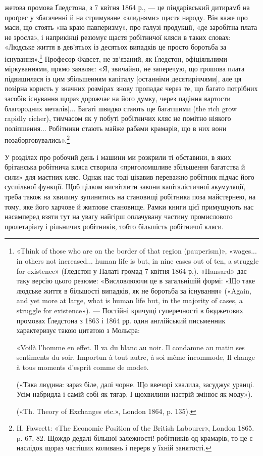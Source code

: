 жетова промова Ґледстона, з 7 квітня 1864 р., — це піндарівський
дитирамб на проґрес у збагаченні й на стримуване «злиднями»
щастя народу. Він каже про маси, що стоять «на краю
павперизму», про галузі продукції, «де заробітна плата не
зросла», і наприкінці резюмує щастя робітничої кляси в таких
словах: «Людське життя в дев’ятьох із десятьох випадків це
просто боротьба за існування».\footnote{
«Think of those who are on the border of that region (pauperism)»,
«wages... in others not increased... human life is but, in nine cases out of ten,
a struggle for existence» (Ґледстон у Палаті громад 7 квітня 1864 р.).
«Hansard» дає таку версію цього резюме: «Висловлюючи це в загальнішій
формі: «Що таке людське життя в більшості випадків, як не боротьба
за існування» («Again, and yet more at large, what is human life but,
in the majority of cases, a struggle for existence»). — Постійні кричущі суперечності
в бюджетових промовах Ґледстона з 1863 і 1864 рр. один англійський
письменник характеризує такою цитатою з Мольєра:

«Voilà l’homme en effet. Il va du blanc au noir.
Il condamne au matin ses sentiments du soir.
Importun à tout autre, à soi même incommode,
Il change à tous moments d’esprit comme de mode».

(«Така людина: зараз біле, далі чорне.
Що ввечорі хвалила, засуджує уранці.
Усім набридла і самій собі як тягар,
І щохвилини настрій змінює як моду»).

(«Th. Theory of Exchanges etc.»,
London 1864, p. 135).
} Професор Фавсет, не зв’язаний,
як Ґледстон, офіціяльними міркуваннями, прямо заявляє:
«Я, звичайно, не заперечую, що грошова плата підвищилася із
цим збільшенням капіталу [останніми десятиріччями], але ця
позірна користь у значних розмірах знову пропадає через те,
що багато потрібних засобів існування щораз дорожчає на його
думку, через падіння вартости благородних металів]... Багаті
швидко стають ще багатшими (the rich grow rapidly richer),
тимчасом як у побуті робітничих кляс не помітно ніякого поліпшення...
Робітники стають майже рабами крамарів, що в них
вони позаборговувались».\footnote{
H. Fawcett: «The Economie Position of the British Labourer»,
London 1865. p. 67, 82. Щождо дедалі більшої залежності! робітників од
крамарів, то це є наслідок щораз частіших коливань і перерв у їхній
занятості.
}

У розділах про робочий день і машини ми розкрили ті обставини,
в яких брітанська робітнича кляса створила «приголомшливе
збільшення багатства й сили» для маєтних кляс. Однак
нас тоді цікавив переважно робітник підчас його суспільної
функції. Щоб цілком висвітлити закони капіталістичної акумуляції,
треба також на хвилину зупинитись на становищі робітника
поза майстернею, на тому, яке його харчове й житлове становище.
Рамки книги цієї примушують нас насамперед взяти тут на увагу
найгірш оплачувану частину промислового пролетаріату і рільничих
робітників, тобто більшість робітничої кляси.
